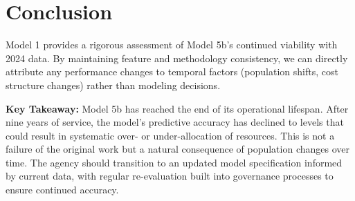     

\section{Conclusion}

Model 1 provides a rigorous assessment of Model 5b's continued viability with 2024 data. By maintaining feature and methodology consistency, we can directly attribute any performance changes to temporal factors (population shifts, cost structure changes) rather than modeling decisions.

\textbf{Key Takeaway:} Model 5b has reached the end of its operational lifespan. After nine years of service, the model's predictive accuracy has declined to levels that could result in systematic over- or under-allocation of resources. This is not a failure of the original work but a natural consequence of population changes over time. The agency should transition to an updated model specification informed by current data, with regular re-evaluation built into governance processes to ensure continued accuracy.
